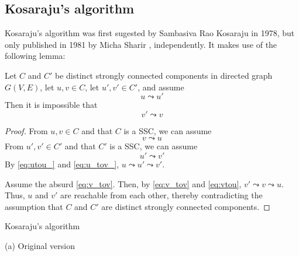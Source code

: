 \subsection{Kosaraju's algorithm} \label{algorithm-scc-kosaraju}
Kosaraju's algorithm was first sugested by Sambasiva Rao Kosaraju in 1978, but only published in 1981 by Micha Sharir \cite{sharir81}, independently. It makes use of the following lemma:
\begin{lemma} \label{lem:kosaraju1}
    Let $C$ and $C'$ be distinct strongly connected components in directed graph $G(V,E)$, let $u,v \in C$, let $u',v' \in C'$, and assume
    \begin{equation}
        \label{eq:utou_} u \leadsto u'
    \end{equation}
    Then it is impossible that
    \begin{equation}
        \label{eq:v_tov} v' \leadsto v
    \end{equation}
\end{lemma}
\begin{proof} From $u, v \in C$ and that $C$ is a SSC, we can assume
    \begin{equation}
        \label{eq:vtou} v \leadsto u
    \end{equation}
    From $u', v' \in C'$ and that $C'$ is a SSC, we can assume
    \begin{equation}
        \label{eq:u_tov_} u' \leadsto v'
    \end{equation}
    By \eqref{eq:utou_} and \eqref{eq:u_tov_}, $u \leadsto u' \leadsto v'$.\par
    Assume the absurd \eqref{eq:v_tov}. Then, by \eqref{eq:v_tov} and \eqref{eq:vtou}, $v' \leadsto v \leadsto u$. Thus, $u$ and $v'$ are reachable from each other, thereby contradicting the assumption that $C$ and $C'$ are distinct strongly connected components.
\end{proof}
\begin{center}
    \begin{algorithm}
        \caption{Kosaraju's algorithm}
        \label{alg-kosaraju}
        \begin{minipage}[t]{0.49\linewidth}
            (a) Original version
            \begin{algorithmic}[1]
                \EndFunction
            \end{algorithmic}
        \end{minipage}
    \end{algorithm}
\end{center}
